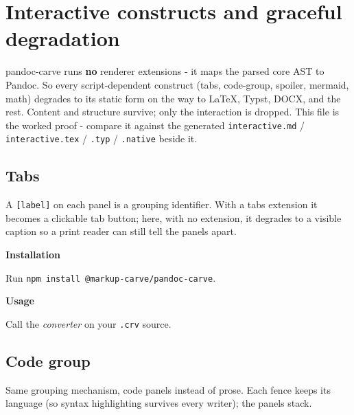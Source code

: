 \section{Interactive constructs and graceful
degradation}\label{Interactive-constructs-and-graceful-degradation}

pandoc-carve runs \textbf{no} renderer extensions - it maps the parsed
core AST to Pandoc. So every script-dependent construct (tabs,
code-group, spoiler, mermaid, math) degrades to its static form on the
way to LaTeX, Typst, DOCX, and the rest. Content and structure survive;
only the interaction is dropped. This file is the worked proof - compare
it against the generated \texttt{interactive.md} /
\texttt{interactive.tex} / \texttt{.typ} / \texttt{.native} beside it.

\subsection{Tabs}\label{Tabs}

A \texttt{{[}label{]}} on each panel is a grouping identifier. With a
tabs extension it becomes a clickable tab button; here, with no
extension, it degrades to a visible caption so a print reader can still
tell the panels apart.

\textbf{Installation}

Run \texttt{npm\ install\ @markup-carve/pandoc-carve}.

\textbf{Usage}

Call the \emph{converter} on your \texttt{.crv} source.

\subsection{Code group}\label{Code-group}

Same grouping mechanism, code panels instead of prose. Each fence keeps
its language (so syntax highlighting survives every writer); the panels
stack.

\begin{Shaded}
\begin{Highlighting}[]
 \NormalTok{ \{ }\OperatorTok{:} \NormalTok{ \}}\OperatorTok{;}
\end{Highlighting}
\end{Shaded}

\begin{Shaded}
\begin{Highlighting}[]
\FunctionTok{\{} \FunctionTok{:}  \FunctionTok{\}}
\end{Highlighting}
\end{Shaded}

